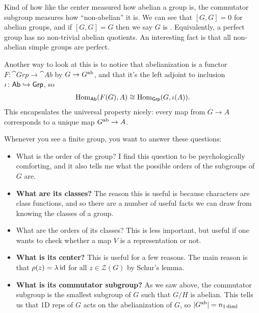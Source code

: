 \documentclass[11pt]{article}
\begin{document}
Kind of how like the center measured how abelian a group is, the commutator
subgroup measures how ``non-abelian'' it is. We can see that $[G, G] = 0$
for abelian groups, and if $[G, G] = G$ then we say $G$ is .
Equivalently, a perfect group has no non-trivial abelian quotients. An interesting
fact is that all non-abelian simple groups are perfect.

Another way to look at this is to notice that abelianization is a
functor $F \colon \cat{Grp} \to \cat{Ab}$ by $G \to G^{\rm ab}$, 
and that it's the left adjoint to inclusion $\iota \colon \text{\sffamily{Ab}} \hookrightarrow \text{\sffamily{Grp}}$, so
\begin{align*}
    \operatorname{Hom}_{\text{\sffamily{Ab}}}(F(G), A) \cong \operatorname{Hom}_{\text{\sffamily{Grp}}}(G, \iota(A)).
\end{align*}
This encapsulates the universal property nicely: every map from
$G \to A$ corresponds to a unique map $G^{\rm ab} \to A$. 

\begin{iidea}
    Whenever you see a finite group, you want to answer these questions:
    \begin{itemize}
        \item What is the order of the group? I find this question to be 
        psychologically comforting, and it also tells me what the possible 
        orders of the subgroups of $G$ are.
        \item \textbf{What are its classes?} The reason this is useful is because
        characters are class functions, and so there are a number of useful facts we can
        draw from knowing the classes of a group.
        \item What are the orders of its classes? This is less important, but useful
        if one wants to check whether a map $V$ is a representation or not.
        \item \textbf{What is its center?} This is useful for a few reasons.
        The main reason is that $\rho(z) = \lambda \operatorname{id}$ for all $z \in \mathcal{Z}(G)$
        by Schur's lemma. 
        \item \textbf{What is its commutator subgroup?} As we saw above, the commutator
        subgroup is the smallest subgroup of $G$ such that $G/H$ is abelian.
        This tells us that 1D reps of $G$ acts on the abelianization of $G$,
        so $|G^{\rm ab}| = n_{1 \, \rm{diml}}$
    \end{itemize}
\end{iidea}
\end{document}
